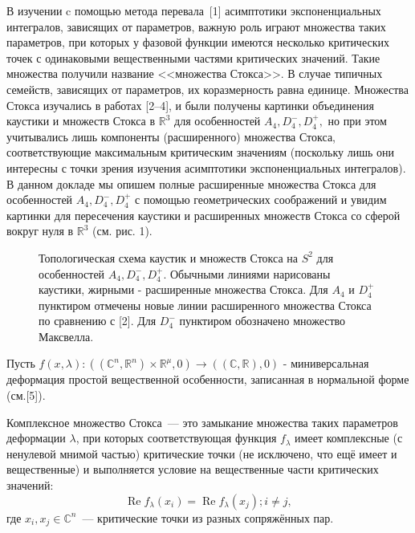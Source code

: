 \vzmscaption

В изучении c помощью метода перевала~[1] асимптотики экспоненциальных интегралов,
зависящих от параметров, важную роль играют множества таких параметров,
при которых у фазовой функции имеются несколько критических точек с одинаковыми вещественными частями критических значений.
Такие множества получили название <<множества Стокса>>.
В случае типичных семейств, зависящих от параметров, их коразмерность равна единице.
Множества Стокса изучались в работах [2--4],
и были получены картинки объединения каустики и множеств Стокса в $\mathbb{R}^3$ для особенностей
$A_{4}, D_{4}^-, D_{4}^+, $ но при этом учитывались лишь компоненты (расширенного) множества Стокса,
соответствующие максимальным критическим значениям (поскольку лишь
\linebreak
они интересны с точки зрения изучения асимптотики экспоненциальных интегралов). В данном докладе мы опишем полные расширенные множества Стокса для особенностей $A_{4}, D_{4}^-, D_{4}^+ $ с помощью геометрических соображений и увидим картинки для пересечения каустики и расширенных множеств Стокса со сферой вокруг нуля в $\mathbb{R}^3$ (см. рис. 1).

	\begin{figure}
		\caption{Топологическая схема каустик и множеств Стокса на $S^2$ для особенностей $A_{4}, D_{4}^-, D_{4}^+ $. Обычными линиями нарисованы каустики, жирными - расширенные множества Стокса. Для $A_4$ и $D_4^+$ пунктиром отмечены новые линии расширенного множества Стокса по сравнению с [2].  Для $ D_{4}^-$ пунктиром обозначено множество Максвелла.}\label{F7}
	\end{figure}


Пусть $f(x,\lambda):((\mathbb{C}^n,\mathbb{R}^n)\times\mathbb{R}^\mu,0)\rightarrow((\mathbb{C},\mathbb{R}),0)$ - миниверсальная деформация простой вещественной особенности, записанная в нормальной форме (см.[5]).


\begin{definition}
	Комплексное множество Стокса~--- это замыкание множества таких параметров деформации $\lambda$,
	при которых соответствующая функция $f_\lambda$ имеет комплексные (с ненулевой мнимой частью)
	критические точки (не исключено, что ещё имеет и вещественные)
	и выполняется условие на вещественные части критических значений:
	$$\mathop{\text{Re}}f_\lambda(x_i)=\mathop{\text{Re}}f_\lambda(x_j);  i\neq j,$$
	где $x_i,x_j\in\mathbb{C}^n$~--- критические точки из разных сопряжённых пар.
\end{definition}


